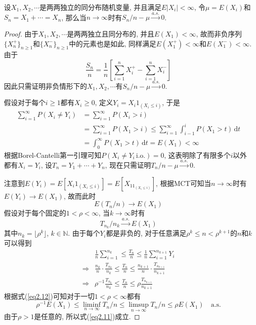 \documentclass[cn, 12pt, math=mtpro2, bibstyle=apa, blue, twocol]{elegantbook}
\begin{document}
\begin{theorem}[Etemadi强大数定律]
  设$X_1,X_2,\cdots$是两两独立的同分布随机变量, 并且满足$E|X_i|<\infty$, 令$\mu=E(X_i)$和$S_n=X_1+\cdots=X_n$, 那么当$n\to\infty$时有$S_n/n-\mu\xrightarrow{a.s.}0$.
\end{theorem}
\begin{proof}
  由于$X_1,X_2,\cdots$是两两独立且同分布的, 并且$E(X_1)<\infty$, 故而非负序列$\{X_n^+\}_{n\ge1}$和$\{X_n^-\}_{n\ge1}$中的元素也是如此, 同样满足$E(X_1^+)<\infty$和$E(X_1^-)<\infty$. 由于
  $$\frac{S_n}{n}=\frac{1}{n}\left[\sum_{i=1}^{n}X_i^+-\sum_{i=1}^{n}X_i^-\right]$$
  因此只需证明非负情形下的$X_1,X_2,\cdots$有$S_n/n-\mu\xrightarrow{a.s.}0$.

  假设对于每个$i\ge1$都有$X_i\ge0$, 定义$Y_i=X_i1_{(X_i\leq i)}$, 于是
  \begin{align*}
  \sum_{i=1}^{\infty}P(X_i\neq Y_i)&=\sum_{i=1}^{\infty}P(X_i>i) \\
  &=\sum_{i=1}^{\infty}P(X_1>i)\leq\sum_{i=1}^{\infty}\int_{i-1}^{i}P(X_1>t)\,\text{d}t \\
  &=\int_{0}^{\infty}P(X_1>t)\,\text{d}t=E(X_1)<\infty
  \end{align*}
  根据Borel-Cantelli第一引理可知$P(X_i\neq Y_i\,\text{i.o.})=0$, 这表明除了有限多个$i$以外都有$X_i=Y_i$, 设$T_n=Y_1+\cdots+Y_n$, 现在只需证明$T_n/n-\mu\xrightarrow{a.s.}0$.

  注意到$E(Y_i)=E[X_i1_{(X_i\leq i)}]=E[X_11_{(X_i\leq i)}]$, 根据MCT可知当$n\to\infty$时有$E(Y_i)\to E(X_1)$, 故而此时
  \begin{equation}\label{eq2.11}
    E(T_n/n)\to E(X_1)
  \end{equation}
  假设对于每个固定的$1<\rho<\infty$, 当$k\to\infty$时有
  \begin{equation}\label{eq2.12}
    T_{n_k}/n_k\xrightarrow{a.s.} E(X_1)
  \end{equation}
  其中$n_k=\lfloor\rho^k\rfloor$, $k\in\mathbb{N}$. 由于每个$Y_i$都是非负的, 对于任意满足$\rho^k\leq n<\rho^{k+1}$的$n$和$k$可以得到
  \begin{align*}
  &\frac{1}{n}\sum_{i=1}^{n_k}\leq \frac{T_n}{n}\leq \frac{1}{n}\sum_{i=1}^{n_{k+1}}Y_i \\
  \Rightarrow &\frac{n_k}{n}\cdot\frac{T_{n_k}}{n_k}\leq\frac{T_n}{n}\leq\frac{n_{k+1}}{n}\cdot\frac{T_{n_{k+1}}}{n_{k+1}} \\
  \Rightarrow&\rho^{-1}\frac{T_{n_k}}{n_k}\leq\frac{T_n}{n}\leq\rho\frac{T_{n_{k+1}}}{n_{k+1}}
  \end{align*}
  根据式(\ref{eq2.12})可知对于一切$1<\rho<\infty$都有
  $$\rho^{-1}E(X_1)\leq \liminf_{n\to\infty}T_n/n\leq\limsup_{n\to\infty}T_n/n\leq \rho E(X_1)\quad \text{a.s.}$$
  由于$\rho>1$是任意的, 所以式(\ref{eq2.11})成立.


\end{proof}
\end{document}
